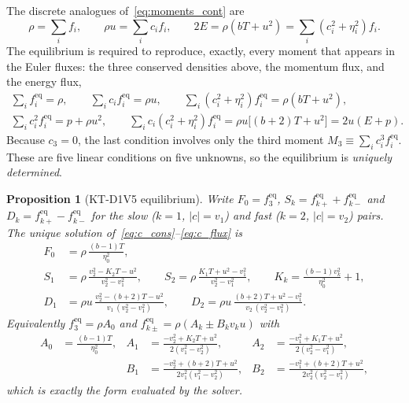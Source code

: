 \documentclass[11pt]{article}
\newtheorem{proposition}{Proposition}
\theoremstyle{remark}
\newcommand{\feq}{f^{\mathrm{eq}}}
\begin{document}
The discrete analogues of~\eqref{eq:moments_cont} are
\begin{equation}
  \rho = \sum_{i} f_i,\qquad
  \rho u = \sum_i c_i f_i,\qquad
  2E = \rho(bT+u^2) = \sum_i (c_i^2 + \eta_i^2) f_i .
  \label{eq:moments_disc}
\end{equation}
The equilibrium is required to reproduce, exactly, every moment that appears in the
Euler fluxes: the three conserved densities above, the momentum flux, and the
energy flux,
\begin{gather}
  \sum_i \feq_i = \rho, \qquad
  \sum_i c_i \feq_i = \rho u, \qquad
  \sum_i (c_i^2+\eta_i^2)\feq_i = \rho(bT+u^2), \label{eq:c_cons}\\
  \sum_i c_i^2 \feq_i = p + \rho u^2, \qquad
  \sum_i c_i (c_i^2+\eta_i^2)\feq_i = \rho u\bigl[(b+2)T + u^2\bigr] = 2u(E+p). \label{eq:c_flux}
\end{gather}
Because $c_3 = 0$, the last condition involves only the third moment
$M_3 \equiv \sum_i c_i^3 \feq_i$.  These are five linear conditions on five
unknowns, so the equilibrium is \emph{uniquely determined}.

\begin{proposition}[KT-D1V5 equilibrium]
\label{prop:feq}
Write $F_0 = \feq_3$, $S_k = \feq_{k+} + \feq_{k-}$ and $D_k = \feq_{k+}-\feq_{k-}$ for the
slow ($k=1$, $|c|=v_1$) and fast ($k=2$, $|c|=v_2$) pairs.  The unique solution
of~\eqref{eq:c_cons}--\eqref{eq:c_flux} is
\begin{align}
  F_0 &= \rho\,\frac{(b-1)T}{\eta_0^2}, \label{eq:F0}\\
  S_1 &= \rho\,\frac{v_2^2 - K_2 T - u^2}{v_2^2 - v_1^2}, \qquad
  S_2 = \rho\,\frac{K_1 T + u^2 - v_1^2}{v_2^2 - v_1^2},
  \qquad K_k = \frac{(b-1)v_k^2}{\eta_0^2}+1, \label{eq:S}\\
  D_1 &= \rho u\,\frac{v_2^2 - (b+2)T - u^2}{v_1\,(v_2^2-v_1^2)}, \qquad
  D_2 = \rho u\,\frac{(b+2)T + u^2 - v_1^2}{v_2\,(v_2^2-v_1^2)} . \label{eq:D}
\end{align}
Equivalently $\feq_3 = \rho A_0$ and $\feq_{k\pm} = \rho(A_k \pm B_k v_k u)$ with
\begin{equation}
\begin{aligned}
  A_0 &= \frac{(b-1)T}{\eta_0^2}, &
  A_1 &= \frac{-v_2^2 + K_2T + u^2}{2(v_1^2-v_2^2)}, &
  A_2 &= \frac{-v_1^2 + K_1T + u^2}{2(v_2^2-v_1^2)},\\
  & &
  B_1 &= \frac{-v_2^2 + (b+2)T + u^2}{2v_1^2(v_1^2-v_2^2)}, &
  B_2 &= \frac{-v_1^2 + (b+2)T + u^2}{2v_2^2(v_2^2-v_1^2)},
\end{aligned}
\label{eq:AB}
\end{equation}
which is exactly the form evaluated by the solver.
\end{proposition}
\end{document}
